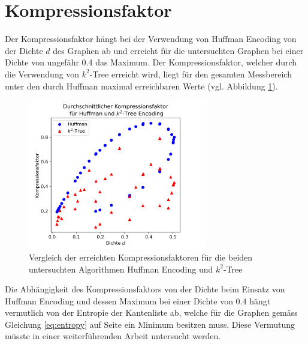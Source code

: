 \documentclass{ffhsthesis}
\begin{document}
\section{Kompressionsfaktor}
Der Kompressionsfaktor hängt bei der Verwendung von Huffman Encoding von der Dichte $d$ des Graphen ab und erreicht für die untersuchten Graphen bei einer Dichte von ungefähr 0.4 das Maximum. Der Kompressionsfaktor, welcher durch die Verwendung von $k^2$-Tree erreicht wird, liegt für den gesamten Messbereich unter den durch Huffman maximal erreichbaren Werte (vgl. Abbildung \ref{fig:compression_factor-vergleich}). 
\begin{figure}[H]
    \centering
    \includegraphics[width=0.7\textwidth]{images/avg_compression_density_no_outliers_color.png}
    \caption{Vergleich der erreichten Kompressionsfaktoren für die beiden untersuchten Algorithmen Huffman Encoding und $k^2$-Tree}
    \label{fig:compression_factor-vergleich}
\end{figure}
Die Abhängigkeit des Kompressionsfaktors von der Dichte beim Einsatz von Huffman Encoding und dessen Maximum bei einer Dichte von $0.4$ hängt vermutlich von der Entropie der Kantenliste ab, welche für die Graphen gemäss Gleichung \ref{eq:entropy} auf Seite \pageref{eq:entropy} ein Minimum besitzen muss. Diese Vermutung müsste in einer weiterführenden Arbeit untersucht werden.
\end{document}
